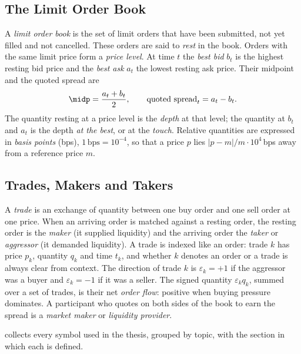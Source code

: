 \subsection{The Limit Order Book}

A \emph{limit order book} is the set of limit orders that have been
submitted, not yet filled and not cancelled. These orders are said to
\emph{rest} in the book. Orders with the same limit price form a
\emph{price level}. At time $t$ the \emph{best bid} $b_t$ is the highest
resting bid price and the \emph{best ask} $a_t$ the lowest resting ask
price. Their midpoint and the quoted spread are
\begin{equation}
  \label{eq:midpoint}
  \midp = \frac{a_t + b_t}{2},
  \qquad
  \text{quoted spread}_t = a_t - b_t .
\end{equation}
The quantity resting at a price level is the \emph{depth} at that level;
the quantity at $b_t$ and $a_t$ is the depth \emph{at the best}, or at
the \emph{touch}. Relative quantities are expressed in \emph{basis points}
(bps), $1\,\text{bps} = 10^{-4}$, so that a price $p$ lies
$|p - m|/m \cdot 10^{4}$\,bps away from a reference price $m$.

\subsection{Trades, Makers and Takers}

A \emph{trade} is an exchange of quantity between one buy order and one
sell order at one price. When an arriving order is matched against a
resting order, the resting order is the \emph{maker} (it supplied
liquidity) and the arriving order the \emph{taker} or \emph{aggressor} (it
demanded liquidity). A trade is indexed like an order: trade $k$ has price
$p_k$, quantity $q_k$ and time $t_k$, and whether $k$ denotes an order or a
trade is always clear from context. The direction of trade $k$ is
$\varepsilon_k = +1$ if the aggressor was a buyer and $\varepsilon_k = -1$
if it was a seller. The signed quantity $\varepsilon_k q_k$, summed over a
set of trades, is their net \emph{order flow}: positive when buying
pressure dominates. A participant who quotes on both sides of the book to
earn the spread is a \emph{market maker} or \emph{liquidity provider}.

 collects every symbol used in the thesis, grouped by
topic, with the section in which each is defined.

